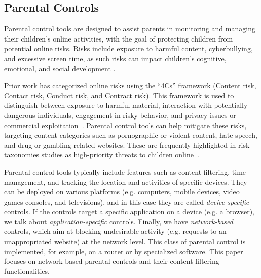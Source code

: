 \subsection{Parental Controls}
Parental control tools are designed to assist parents in monitoring and managing their children’s online activities, with the goal of protecting children from potential online risks.
Risks include exposure to harmful content, cyberbullying, and excessive screen time, as such risks can impact children's cognitive, emotional, and social development \cite{livingstone_4cs_2021}.

Prior work has categorized online risks using the ``4Cs'' framework (Content risk, Contact risk, Conduct risk, and Contract risk).
This framework is used to distinguish between exposure to harmful material, interaction with potentially dangerous individuals, engagement in risky behavior, and privacy issues or commercial exploitation~\cite{livingstone_4cs_2021, bik_classifying_2023}.
Parental control tools can help mitigate these risks, targeting content categories such as pornographic or violent content, hate speech, and drug or gambling-related websites. 
These are frequently highlighted in risk taxonomies studies as high-priority threats to children online~\cite{alqahtani_state_2017, machado_fernandes_taxonomy_2022}.

Parental control tools typically include features such as content filtering, time management, and tracking the location and activities of specific devices. They can be deployed on various platforms (e.g. computers, mobile devices, video games consoles, and televisions), and in this case they are called \emph{device-specific} controls. If the controls target a specific application on a device (e.g. a browser), we talk about \emph{application-specific} controls. Finally, we have \emph{network-based} controls, which aim at blocking undesirable activity (e.g. requests to an unappropriated website) at the network level. This class of parental control is implemented, for example, on a router or by specialized software. This paper focuses on network-based parental controls and their content-filtering functionalities.

